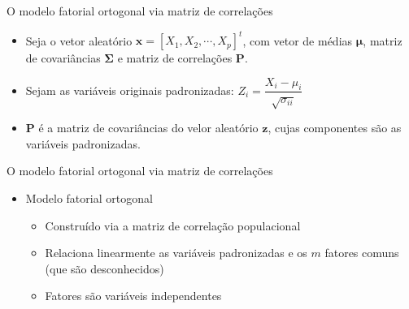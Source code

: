\documentclass[
  ignorenonframetext,
  aspectratio=169,
]{beamer}
\providecommand{\tightlist}{%
  \setlength{\itemsep}{0pt}\setlength{\parskip}{0pt}}
\begin{document}
\begin{frame}{O modelo fatorial ortogonal via matriz de correlações}
\label{o-modelo-fatorial-ortogonal-via-matriz-de-correlauxe7uxf5es}
\begin{itemize}
\tightlist
\item
  Seja o vetor aleatório \(\mathbf{x} = [X_1, X_2, \cdots, X_p]^t\), com
  vetor de médias \(\boldsymbol{\mu}\), matriz de covariâncias
  \(\boldsymbol{\Sigma}\) e matriz de correlações \(\boldsymbol{P}\).
\end{itemize}

\pause

\begin{itemize}
\tightlist
\item
  Sejam as variáveis originais padronizadas:
  \(Z_i = \dfrac{X_i - \mu_i}{\sqrt{\sigma_{ii}}}\)
\end{itemize}

\pause

\begin{itemize}
\tightlist
\item
  \(\boldsymbol{P}\) é a matriz de covariâncias do velor aleatório
  \(\boldsymbol{z}\), cujas componentes são as variáveis padronizadas.
\end{itemize}
\end{frame}

\begin{frame}{O modelo fatorial ortogonal via matriz de correlações}
\label{o-modelo-fatorial-ortogonal-via-matriz-de-correlauxe7uxf5es-1}
\begin{itemize}
\tightlist
\item
  Modelo fatorial ortogonal

  \begin{itemize}
  \tightlist
  \item
    Construído via a matriz de correlação populacional
  \item
    Relaciona linearmente as variáveis padronizadas e os \(m\) fatores
    comuns (que são desconhecidos)
  \item
    Fatores são variáveis independentes
  \end{itemize}
\end{itemize}
\end{frame}
\end{document}
